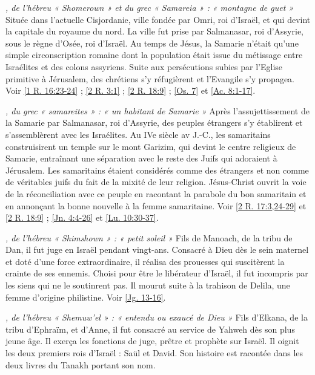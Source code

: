 \begin{multicols}{2}
\textit{, de l'hébreu « Shomerown » et du grec « Samareia » : « montagne de guet »}\newline
Située dans l'actuelle Cisjordanie, ville fondée par Omri, roi d'Israël, et qui devint la capitale du royaume du nord. La ville fut prise par Salmanasar, roi d'Assyrie, sous le règne d'Osée, roi d'Israël. Au temps de Jésus, la Samarie n'était qu'une simple circonscription romaine dont la population était issue du métissage entre Israélites et des colons assyriens. Suite aux persécutions subies par l'Eglise primitive à Jérusalem, des chrétiens s'y réfugièrent et l'Evangile s'y propagea. Voir \vref{1 R. 16:23-24} ; \vref{2 R. 3:1} ; \vref{2 R. 18:9} ; \vref{Os. 7} et \vref{Ac. 8:1-17}.

\textit{, du grec « samareites » : « un habitant de Samarie »}\newline
Après l'assujettissement de la Samarie par Salmanasar, roi d'Assyrie, des peuples étrangers s'y établirent et s'assemblèrent avec les Israélites. Au IVe siècle av J.-C., les samaritains construisirent un temple sur le mont Garizim, qui devint le centre religieux de Samarie, entraînant une séparation avec le reste des Juifs qui adoraient à Jérusalem. Les samaritains étaient considérés comme des étrangers et non comme de véritables juifs du fait de la mixité de leur religion. Jésus-Christ ouvrit la voie de la réconciliation avec ce peuple en racontant la parabole du bon samaritain et en annonçant la bonne nouvelle à la femme samaritaine. Voir \vref{2 R. 17:3,24-29} et \vref{2 R. 18:9} ; \vref{Jn. 4:4-26} et \vref{Lu. 10:30-37}.

\textit{, de l'hébreu « Shimshown » : « petit soleil »}\newline
Fils de Manoach, de la tribu de Dan, il fut juge en Israël pendant vingt-ans. Consacré à Dieu dès le sein maternel et doté d'une force extraordinaire, il réalisa des prouesses qui suscitèrent la crainte de ses ennemis. Choisi pour être le libérateur d'Israël, il fut incompris par les siens qui ne le soutinrent pas. Il mourut suite à la trahison de Delila, une femme d'origine philistine. Voir \vref{Jg. 13-16}.

\textit{, de l'hébreu « Shemuw'el » : « entendu ou exaucé de Dieu »}\newline
Fils d'Elkana, de la tribu d'Ephraïm, et d'Anne, il fut consacré au service de Yahweh dès son plus jeune âge. Il exerça les fonctions de juge, prêtre et prophète sur Israël. Il oignit les deux premiers rois d'Israël : Saül et David. Son histoire est racontée dans les deux livres du Tanakh portant son nom.


\end{multicols}
